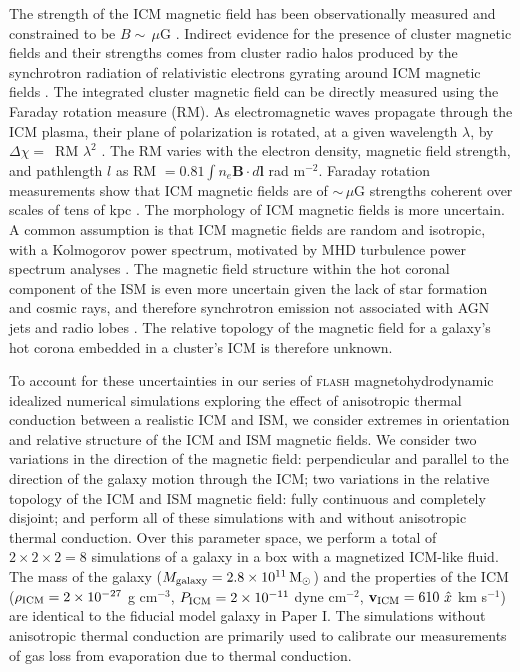 \documentclass[twocolumn]{aastex6}
\newcommand{\msun}{\, \mbox{M}_{\odot}}
\newcommand{\muG}{\, \mu\mbox{G}}
\newcommand{\flash}{{\normalfont\scshape flash }}
\begin{document}
The strength of the ICM magnetic field has been observationally measured and constrained to be $B \sim \muG$ \citep[reviewed in ][]{Carilli02,Govoni04,Kronberg05,Ryu12}. Indirect evidence for the presence of cluster magnetic fields and their strengths comes from cluster radio halos produced by the synchrotron radiation of relativistic electrons gyrating around ICM magnetic fields \citep[e.g., ][]{Miley80,Giovannini93,Feretti99,Govoni04}. The integrated cluster magnetic field can be directly measured using the Faraday rotation measure (RM). As electromagnetic waves propagate through the ICM plasma, their plane of polarization is rotated, at a given wavelength $\lambda$, by $\Delta \chi = $~RM $\lambda^2$ \citep{Burn66}. The RM varies with the electron density, magnetic field strength, and pathlength $l$ as RM $= 0.81 \int n_e \mathbf{B} \cdot d\mathbf{l}$ rad m$^{-2}$. Faraday rotation measurements show that ICM magnetic fields are of $\sim \muG$ strengths coherent over scales of tens of kpc \citep[e.g., ][]{Vallee86,Vallee87,Kim90,Kim91,Taylor93,Taylor94,Clarke01,Taylor01,
Rudnick03,Murgia04,Bonafede10,Bonafede11,Govoni10,Vacca12,Bonafede13}. The morphology of ICM magnetic fields is more uncertain. A common assumption is that ICM magnetic fields are random and isotropic, with a Kolmogorov power spectrum, motivated by MHD turbulence power spectrum analyses \citep[e.g.,][]{Vogt03,Vogt05}. 
The magnetic field structure within the hot coronal component of the ISM is even more uncertain given the lack of star formation and cosmic rays, and therefore synchrotron emission not associated with AGN jets and radio lobes \citep{Beck11,Beck13}. The relative topology of the magnetic field for a galaxy's hot corona embedded in a cluster's ICM is therefore unknown. 

To account for these uncertainties in our series of \flash magnetohydrodynamic idealized numerical simulations exploring the effect of anisotropic thermal conduction between a realistic ICM and ISM, we consider extremes in orientation and relative structure of the ICM and ISM magnetic fields. We consider two variations in the direction of the magnetic field: perpendicular and parallel to the direction of the galaxy motion through the ICM; two variations in the relative topology of the ICM and ISM magnetic field: fully continuous and completely disjoint; and perform all of these simulations with and without anisotropic thermal conduction. Over this parameter space, we perform a total of $2 \times 2 \times 2 = 8$ simulations of a galaxy in a box with a magnetized ICM-like fluid. The mass of the galaxy ($M_{\rm galaxy}  = 2.8 \times 10^{11} \msun$) and the properties of the ICM ($\rho_{\rm ICM} = 2 \times 10^{-27}$ g cm$^{-3}$, $P_{\rm ICM} = 2 \times 10^{-11}$ dyne cm$^{-2}$, $\mathbf{v}_{\rm ICM} = 610~\hat{x}$ km s$^{-1}$) are identical to the fiducial model galaxy in Paper I.  The simulations without anisotropic thermal conduction are primarily used to calibrate our measurements of gas loss from evaporation due to thermal conduction.
\end{document}

